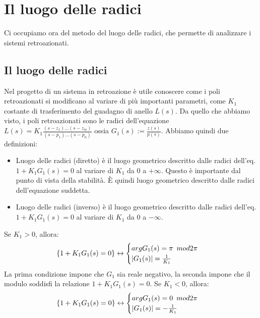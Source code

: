 \documentclass[11pt]{article}
\begin{document}
\section{Il luogo delle radici}
Ci occupiamo ora del metodo del luogo delle radici, che permette di analizzare i sistemi retroazionati. 
\subsection{Il luogo delle radici}
Nel progetto di un sistema in retroazione è utile conoscere come i poli retroazionati si modificano al variare di più importanti parametri, come $K_1$ costante di trasferimento del guadagno di anello $L(s)$. Da quello che abbiamo visto, i poli retroazionati sono le radici dell'equazione $L(s)=K_1\frac{(s-z_1)...(s-z_m)}{(s-p_1)...(s-p_n)}$ ossia $G_1(s) := \frac{z(s)}{p(s)}$. Abbiamo quindi due definizioni:
\begin{itemize}
    \item Luogo delle radici (diretto) è il luogo geometrico descritto dalle radici dell'eq. $1+K_1G_1(s)=0$ al variare di $K_1$ da 0 a $+\infty$. Questo è importante dal punto di vista della stabilità.  È quindi luogo geometrico descritto dalle radici dell'equazione suddetta.
    \item Luogo delle radici (inverso) è il luogo geometrico descritto dalle radici dell'eq. $1+K_1G_1(s)=0$ al variare di $K_1$ da 0 a $-\infty$.
\end{itemize}
Se $K_1>0$, allora:
\begin{displaymath}
    \{1+K_1G_1(s)=0\} \leftrightarrow \begin{cases}
        argG_1(s)=\pi\hspace{5px}mod2\pi\\
        |G_1(s)| = \frac{1}{K_1}
    \end{cases}
\end{displaymath}
La prima condizione impone che $G_1$ sia reale negativo, la seconda impone che il modulo soddisfi la relazione $1+K_1G_1(s)=0$.
Se $K_1<0$, allora:
\begin{displaymath}
    \{1+K_1G_1(s)=0\} \leftrightarrow \begin{cases}
        argG_1(s)=0\hspace{5px}mod2\pi\\
        |G_1(s)| = -\frac{1}{K_1}
    \end{cases}
\end{displaymath}
\end{document}
